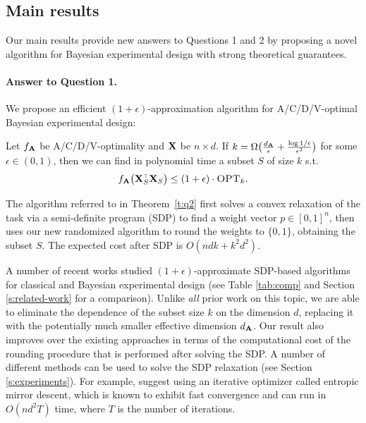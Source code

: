 \documentclass[thesis.tex]{subfiles}
\begin{document}
\subsection{Main results}
Our main results provide new answers to Questions 1 and 2
by proposing a novel algorithm for Bayesian experimental design with
strong theoretical guarantees.

  \paragraph{Answer to Question 1.}
We propose an efficient $(1+\epsilon)$-approximation algorithm for
A/C/D/V-optimal Bayesian  experimental design:
\begin{theorem}\label{t:q2}
  Let $f_{\mathbf A}$ be A/C/D/V-optimality and $\mathbf X$ be $n\times d$. If
  $k=\Omega\big(\frac{d_{\mathbf A}}{\epsilon} +
  \frac{\log1/\epsilon}{\epsilon^2}\big)$ for some $\epsilon\in(0,1)$, then 
we can find in polynomial time a subset $S$ of size $k$ s.t.
  \begin{align*}
    f_{\A}\big(\X_S^\top\X_S\big) \leq (1+\epsilon)\cdot\opt.
  \end{align*}
\end{theorem}
\begin{remark}
  The algorithm referred to in Theorem~\ref{t:q2} first solves a convex
  relaxation of the task via a semi-definite program (SDP) to find a
  weight vector $p\in[0,1]^n$, then uses our new randomized algorithm 
  to round the weights to $\{0,1\}$, obtaining the subset
  $S$. The expected cost after SDP is $O(ndk+k^2d^2)$.
\end{remark}

A number of recent works studied $(1+\epsilon)$-approximate SDP-based algorithms 
for classical and Bayesian experimental design (see Table
\ref{tab:comp} and Section \ref{s:related-work} for a comparison). Unlike \emph{all} prior work on
this topic, we are able to eliminate the
dependence of the subset size $k$ on the dimension $d$, replacing it
with the potentially much smaller effective dimension $d_\mathbf A$.
Our result also improves over the existing approaches in terms of the computational
cost of the rounding procedure that is performed after solving the SDP. A
number of different methods can be used to solve the SDP relaxation (see
Section \ref{s:experiments}). For
example, \cite{near-optimal-design} suggest using an iterative
optimizer called entropic mirror descent, which is known to exhibit
fast convergence and can run in $O(nd^2T)$ time, where $T$ is the
number of iterations. 
\end{document}
